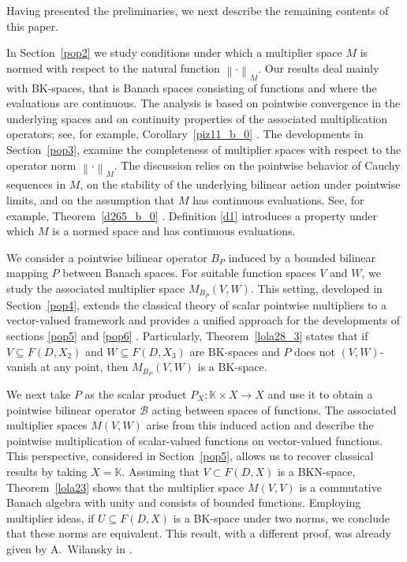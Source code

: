 \documentclass[14pt, a4paper]{article}  %
\newcounter{property}
\providecommand{\pare}[1]{\left( #1\right) }
\providecommand{\norm}[1]{\left\lVert#1\right\rVert}
\newcommand{\K}{\mathbb{K}}
\newcommand{\BK}{\text{BK}}
\newcommand{\BB}{\mathscr{B}}
\begin{document}
	Having presented the preliminaries, we next describe the remaining contents of this paper.
	
		In Section~\ref{pop2}  we study conditions under which a multiplier space $M$ is normed with
		respect to the natural function $\norm{\cdot}_{M}$. Our results  deal  mainly with BK-spaces, that is  Banach spaces consisting of functions and where the evaluations are continuous. The analysis is based on pointwise convergence in the underlying  spaces and on continuity properties of the associated multiplication operators; see, for example, Corollary~\ref{piz11_b_0} .  
The developments in Section~\ref{pop3},  examine the completeness of multiplier spaces with respect to the operator norm $\norm{\cdot}_{M}$. The discussion relies on the pointwise behavior of Cauchy sequences in $M$, on the stability of the underlying bilinear action under pointwise limits, and on the assumption that $M$ has continuous evaluations. See, for example, Theorem~\ref{d265_b_0} . Definition \ref{d1} introduces a property under which  $M$ is a normed space and has continuous evaluations.
	
	We consider a pointwise bilinear operator $B_{P}$ induced by a bounded bilinear
	mapping $P$ between Banach spaces. For suitable function spaces $V$ and $W$, we
	study the associated multiplier space $M_{B_{P}}(V,W)$. This setting, developed
	in Section~\ref{pop4}, extends the classical theory of scalar pointwise multipliers to a
	vector-valued framework and provides a unified approach for the developments of sections \ref{pop5} and \ref{pop6} .   Particularly, Theorem~\ref{lola28_3} states that if $V \subseteq F(D, X_{2})$ and $W \subseteq F(D, X_{3})$ are $\BK$-spaces and $P$ does not $\pare{V,W}$-vanish at any point, then $M_{B_{P}}(V, W)$ is a $\BK$-space.
	
	 
	We next take $P$ as the scalar product $P_{X} \colon \K \times X \to X$ and use it to obtain a pointwise bilinear operator $\BB$ acting between spaces of functions. The associated multiplier spaces $M(V,W)$ arise from this induced action and describe the pointwise multiplication of scalar-valued functions on vector-valued functions. This perspective, considered in Section~\ref{pop5}, allows us to recover classical results  by taking $X = \K$. Assuming that $V \subset F(D,X)$ is a BKN-space,   Theorem~\ref{lola23} shows that the multiplier space $M(V,V)$ is a commutative Banach algebra with unity and  consists of bounded functions. Employing multiplier ideas, if   $U \subseteq F(D,X)$ is a BK-space under two norms, we conclude that these norms are equivalent. This result, with a different proof,  was already given by A.~Wilansky in \cite[p.~55]{Wil}.
	 
\end{document}

